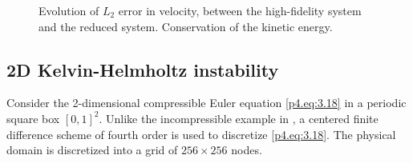 \begin{figure} [t]
	\begin{centering}
	\caption{\protect{} Evolution of $L_2$ error in velocity, between the high-fidelity system and the reduced system. \protect{} Conservation of the kinetic energy.}
	\label{p4.fig:energy_approx_err}
	\end{centering}
\end{figure}

\subsection{2D Kelvin-Helmholtz instability}
Consider the 2-dimensional compressible Euler equation \eqref{p4.eq:3.18} in a periodic square box $[0,1]^2$. Unlike the incompressible example in , a centered finite difference scheme of fourth order is used to discretize \eqref{p4.eq:3.18}. The physical domain is discretized into a grid of $256\times 256$ nodes.


